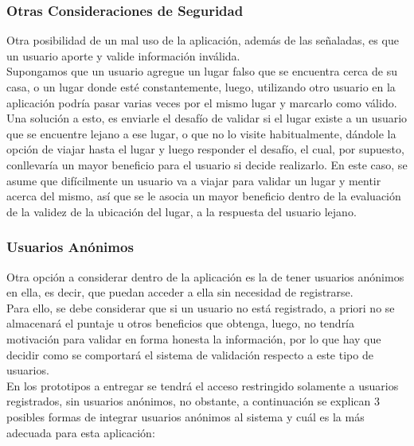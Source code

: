 \documentclass[10pt,letterpaper]{article}
\begin{document}
\subsubsection{Otras Consideraciones de Seguridad}

Otra posibilidad de un mal uso de la aplicación, además de las señaladas, es que un usuario aporte y valide información inválida.\\ Supongamos que un usuario agregue un lugar falso que se encuentra cerca de su casa, o un lugar donde esté constantemente, luego, utilizando otro usuario en la aplicación podría pasar varias veces por el mismo lugar y marcarlo como válido. Una solución a esto, es enviarle el desafío de validar si el lugar existe a un usuario que se encuentre lejano a ese lugar, o que no lo visite habitualmente, dándole la opción de viajar hasta el lugar y luego responder el desafío, el cual, por supuesto, conllevaría un mayor beneficio para el usuario si decide realizarlo. En este caso, se asume que difícilmente un usuario va a viajar para validar un lugar y mentir acerca del mismo, así que se le asocia un mayor beneficio dentro de la evaluación de la validez de la ubicación del lugar, a la respuesta del usuario lejano.\\

\subsubsection{Usuarios Anónimos}

Otra opción a considerar dentro de la aplicación es la de tener usuarios anónimos en ella, es decir, que puedan acceder a ella sin necesidad de registrarse.\\

Para ello, se debe considerar que si un usuario no está registrado, a priori no se almacenará el puntaje u otros beneficios que obtenga, luego, no tendría motivación para validar en forma honesta la información, por lo que hay que decidir como se comportará el sistema de validación respecto a este tipo de usuarios.\\

En los prototipos a entregar se tendrá el acceso restringido solamente a usuarios registrados, sin usuarios anónimos, no obstante, a continuación se explican 3 posibles formas de integrar usuarios anónimos al sistema y cuál es la más adecuada para esta aplicación:\\
\end{document}
